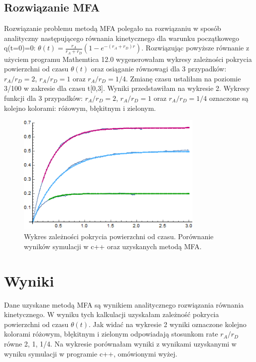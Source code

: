 \documentclass[]{report}
\begin{document}
\subsection{Rozwiązanie MFA}
Rozwiązanie problemu metodą MFA polegało na rozwiązaniu w sposób analityczny następującego równania kinetycznego dla warunku początkowego q(t=0)=0:
$\theta(t)=\frac{r_{A}}{r_{A}+r_{D}}\left(1-e^{-\left(r_{A}+r_{D}\right) r}\right)$.
Rozwiązując powyższe równanie z użyciem programu Mathemtica 12.0 wygenerowałam wykresy zależności pokrycia powierzchni od czasu $\theta (t)$ oraz osiąganie równowagi dla 3 przypadków:  $r_A/r_D = 2$, $r_A/r_D = 1$  oraz $r_A/r_D =1/4$. Zmianę czasu ustaliłam na poziomie 3/100 w zakresie dla czasu t[0,3]. Wyniki przedstawiłam na wykresie 2. Wykresy funkcji dla 3 przypadków:  $r_A/r_D = 2$, $r_A/r_D = 1$  oraz $r_A/r_D =1/4$ oznaczone są kolejno kolorami:  różowym, błękitnym i zielonym.

\begin{figure}
	\includegraphics[width=0.8\textwidth]{Wykres2.png}
	\caption{Wykres zależności pokrycia powierzchni od czasu. Porównanie wyników symulacji w c++ oraz uzyskanych metodą MFA.}
	\label{fig:W2}
\end{figure}

\section{Wyniki}
Dane uzyskane metodą MFA są wynikiem analitycznego rozwiązania równania kinetycznego. 
W wyniku tych kalkulacji uzyskałam zależność pokrycia powierzchni od czasu $\theta (t)$. Jak widać na wykresie 2 wyniki oznaczone kolejno kolorami różowym, błękitnym i zielonym odpowiadają stosunkom rate $r_{A}/r_{D}$  równe 2, 1, 1/4. Na wykresie porównałam wyniki z wynikami uzyskanymi w wyniku symulacji w programie c++, omówionymi wyżej. 
\end{document}
